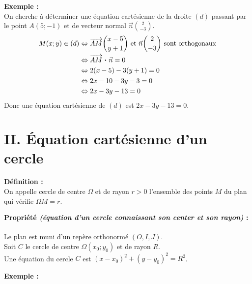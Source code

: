 \documentclass[11pt,a4paper]{article}
\newcommand{\pdt}{\mathbin{\vcenter{\hbox{\scalebox{0.6}{\textbullet}}}}}
\begin{document}
\textbf{Exemple :} ~\\
On cherche à déterminer une équation cartésienne de la droite $(d)$ passant par le point $A(5;-1)$ et de vecteur normal $\displaystyle \vec{n} \binom{2}{-3}$.
\begin{equation*}
  \begin{split}
    M(x;y)\in (d) & \Leftrightarrow \overrightarrow{AM} \binom{x-5}{y+1} \text{ et } \vec{n} \binom{2}{-3} \text{ sont orthogonaux}\\
    & \Leftrightarrow \overrightarrow{AM}\pdt\vec{n} = 0 \\
    & \Leftrightarrow 2(x-5)-3(y+1)=0 \\
    & \Leftrightarrow 2x-10-3y-3=0 \\
    & \Leftrightarrow 2x-3y-13=0
  \end{split}
\end{equation*}
Donc une équation cartésienne de $(d)$ est $2x-3y-13=0$.

\newpage

\section*{II. Équation cartésienne d'un cercle}

\begin{mdframed}[style=definitionStyle]
  \textbf{Définition :} ~\\
  On appelle cercle de centre $\Omega$ et de rayon $r>0$ l'ensemble des points $M$ du plan qui vérifie $\Omega M=r$.
\end{mdframed}

\begin{mdframed}[style=proprieteStyle]
  \textbf{Propriété \emph{(équation d'un cercle connaissant son center et son rayon)} :} ~\\
  Le plan est muni d'un repère orthonormé $(O,I,J)$. \\
  Soit $C$ le cercle de centre $\Omega(x_0;y_0)$ et de rayon $R$. \\
  Une équation du cercle $C$ est $(x-x_0)^2+(y-y_0)^2=R^2$.
\end{mdframed}

\textbf{Exemple :} ~\\
\end{document}
